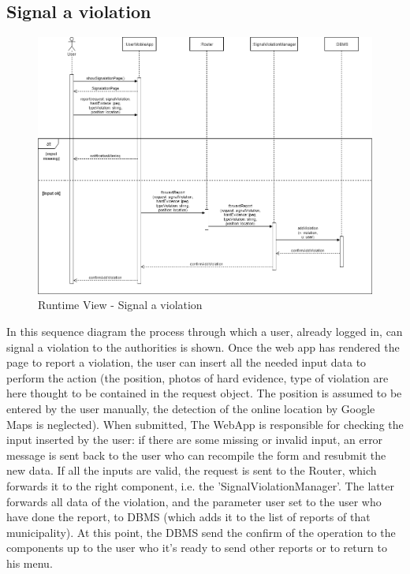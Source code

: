         \subsection{Signal a violation}
        \begin{figure}[H]
            \includegraphics[scale=0.33]{dd/resources/images/RuntimeView-SignalViolation}
            \caption{Runtime View - Signal a violation}        
        \end{figure}
        In this sequence diagram the process through which a user, already
        logged in, can signal a violation to the authorities is shown. Once the
        web app has rendered the page to report a violation, the user can insert
        all the needed input data to perform the action (the position, photos of
        hard evidence, type of violation are here thought to be contained in the
        request object. The position is assumed to be entered by the user
        manually, the detection of the online location by Google Maps is
        neglected). When submitted, The WebApp is responsible for checking the input 
        inserted by the user: if there are some missing or invalid input, an error message is sent
        back to the user who can recompile the form and resubmit the new data.
        If all the inputs are valid, the request is sent to the Router, which
        forwards it to the right component, i.e. the 'SignalViolationManager'.
        The latter forwards all data of the violation, and the parameter user set 
        to the user who have done the report, to DBMS (which adds it to the list of reports of that 
        municipality). At this point, the DBMS send the confirm of the operation to 
        the components up to the user who it's ready to send other reports or to 
        return to his menu.

